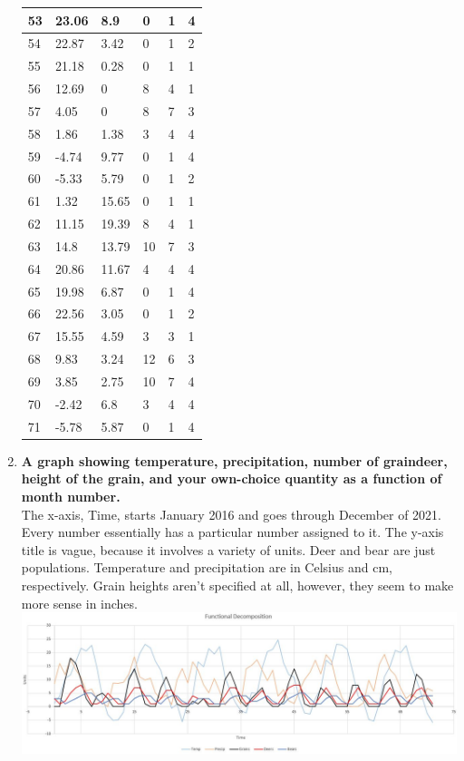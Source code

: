 \documentclass[12pt]{article} %
\begin{document}
\begin{enumerate}
\begin{center}
\begin{tabular}{ | l | l | l | l | l | l | }
				53 & 23.06 & 8.9 & 0 & 1 & 4 \\ \hline
				54 & 22.87 & 3.42 & 0 & 1 & 2 \\ \hline
				55 & 21.18 & 0.28 & 0 & 1 & 1 \\ \hline
				56 & 12.69 & 0 & 8 & 4 & 1 \\ \hline
				57 & 4.05 & 0 & 8 & 7 & 3 \\ \hline
				58 & 1.86 & 1.38 & 3 & 4 & 4 \\ \hline
				59 & -4.74 & 9.77 & 0 & 1 & 4 \\ \hline
				60 & -5.33 & 5.79 & 0 & 1 & 2 \\ \hline
				61 & 1.32 & 15.65 & 0 & 1 & 1 \\ \hline
				62 & 11.15 & 19.39 & 8 & 4 & 1 \\ \hline
				63 & 14.8 & 13.79 & 10 & 7 & 3 \\ \hline
				64 & 20.86 & 11.67 & 4 & 4 & 4 \\ \hline
				65 & 19.98 & 6.87 & 0 & 1 & 4 \\ \hline
				66 & 22.56 & 3.05 & 0 & 1 & 2 \\ \hline
				67 & 15.55 & 4.59 & 3 & 3 & 1 \\ \hline
				68 & 9.83 & 3.24 & 12 & 6 & 3 \\ \hline
				69 & 3.85 & 2.75 & 10 & 7 & 4 \\ \hline
				70 & -2.42 & 6.8 & 3 & 4 & 4 \\ \hline
				71 & -5.78 & 5.87 & 0 & 1 & 4 \\ \hline
			\end{tabular}
		\end{center}
		\item \textbf{A graph showing temperature, precipitation, number of graindeer, height of the grain, and your own-choice quantity as a function of month number.} \\
		The x-axis, Time, starts January 2016 and goes through December of 2021. Every number essentially has a particular number assigned to it. The y-axis title is vague, because it involves a variety of units. Deer and bear are just populations. Temperature and precipitation are in Celsius and cm, respectively. Grain heights aren't specified at all, however, they seem to make more sense in inches.\\
		\hspace*{-2.7cm}\includegraphics[scale=0.65]{graph}
		

\end{enumerate}
\end{document}
